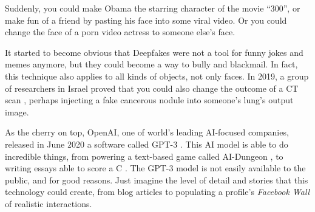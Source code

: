 Suddenly, you could make Obama the starring character of the movie ``300'', or make fun of a friend by pasting his face into some viral video. Or you could change the face of a porn video actress to someone else's face.

It started to become obvious that Deepfakes were not a tool for funny jokes and memes anymore, but they could become a way to bully and blackmail. In fact, this technique also applies to all kinds of objects, not only faces. In 2019, a group of researchers in Israel proved that you could also change the outcome of a CT scan \cite{Hospital63:online}, perhaps injecting a fake cancerous nodule into someone's lung's output image.

As the cherry on top, OpenAI, one of world's leading AI-focused companies, released in June 2020 a software called GPT-3 \cite{brown2020language}. This AI model is able to do incredible things, from powering a text-based game called AI-Dungeon \cite{AIDungeo6:online}, to writing essays able to score a C \cite{WhatGrad58:online}. The GPT-3 model is not easily available to the public, and for good reasons. Just imagine the level of detail and stories that this technology could create, from blog articles to populating a profile's \textit{Facebook Wall} of realistic interactions.
